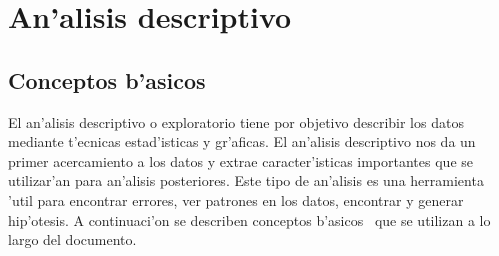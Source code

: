 \chapter{An'alisis descriptivo}

\section{Conceptos b'asicos}


El an'alisis descriptivo o exploratorio tiene por objetivo describir los datos mediante t'ecnicas estad'isticas y gr'aficas. El an'alisis descriptivo nos da un primer acercamiento a los datos y extrae caracter'isticas importantes que se utilizar'an para an'alisis posteriores. Este tipo de an'alisis es una herramienta 'util para encontrar errores, ver patrones en los datos, encontrar y generar hip'otesis. A continuaci'on se describen conceptos b'asicos~\cite{st1,st2,st3,staplicaciones} que se utilizan a lo largo del documento.


